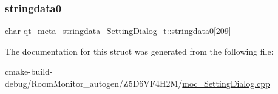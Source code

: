 \subsubsection{\texorpdfstring{stringdata0}{stringdata0}}
{\footnotesize\ttfamily char qt\+\_\+meta\+\_\+stringdata\+\_\+\+Setting\+Dialog\+\_\+t\+::stringdata0\mbox{[}209\mbox{]}}



The documentation for this struct was generated from the following file\+:\begin{DoxyCompactItemize}
\item 
cmake-\/build-\/debug/\+Room\+Monitor\+\_\+autogen/\+Z5\+D6\+V\+F4\+H2\+M/\hyperlink{moc___setting_dialog_8cpp}{moc\+\_\+\+Setting\+Dialog.\+cpp}\end{DoxyCompactItemize}
